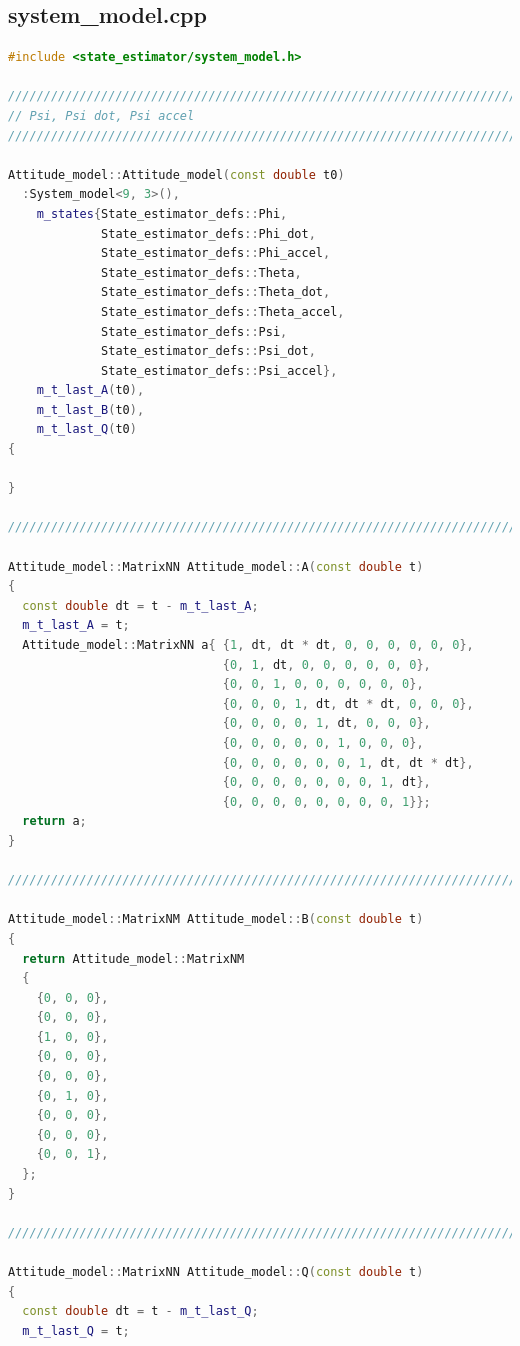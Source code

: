 \documentclass[applsci,article,submit,pdftex,moreauthors]{Definitions/mdpi}
\begin{document}
\subsection{system\_model.cpp}
\begin{lstlisting}[language=c++]
#include <state_estimator/system_model.h>

///////////////////////////////////////////////////////////////////////
// Psi, Psi dot, Psi accel
///////////////////////////////////////////////////////////////////////

Attitude_model::Attitude_model(const double t0)
  :System_model<9, 3>(),
    m_states{State_estimator_defs::Phi,
             State_estimator_defs::Phi_dot,
             State_estimator_defs::Phi_accel,
             State_estimator_defs::Theta,
             State_estimator_defs::Theta_dot,
             State_estimator_defs::Theta_accel,
             State_estimator_defs::Psi,
             State_estimator_defs::Psi_dot,
             State_estimator_defs::Psi_accel},
    m_t_last_A(t0),
    m_t_last_B(t0),
    m_t_last_Q(t0)
{

}

///////////////////////////////////////////////////////////////////////

Attitude_model::MatrixNN Attitude_model::A(const double t)
{
  const double dt = t - m_t_last_A;
  m_t_last_A = t;
  Attitude_model::MatrixNN a{ {1, dt, dt * dt, 0, 0, 0, 0, 0, 0},
                              {0, 1, dt, 0, 0, 0, 0, 0, 0},
                              {0, 0, 1, 0, 0, 0, 0, 0, 0},
                              {0, 0, 0, 1, dt, dt * dt, 0, 0, 0},
                              {0, 0, 0, 0, 1, dt, 0, 0, 0},
                              {0, 0, 0, 0, 0, 1, 0, 0, 0},
                              {0, 0, 0, 0, 0, 0, 1, dt, dt * dt},
                              {0, 0, 0, 0, 0, 0, 0, 1, dt},
                              {0, 0, 0, 0, 0, 0, 0, 0, 1}};
  return a;
}

///////////////////////////////////////////////////////////////////////

Attitude_model::MatrixNM Attitude_model::B(const double t)
{
  return Attitude_model::MatrixNM
  {
    {0, 0, 0},
    {0, 0, 0},
    {1, 0, 0},
    {0, 0, 0},
    {0, 0, 0},
    {0, 1, 0},
    {0, 0, 0},
    {0, 0, 0},
    {0, 0, 1},
  };
}

///////////////////////////////////////////////////////////////////////

Attitude_model::MatrixNN Attitude_model::Q(const double t)
{
  const double dt = t - m_t_last_Q;
  m_t_last_Q = t;


\end{lstlisting}
\end{document}
